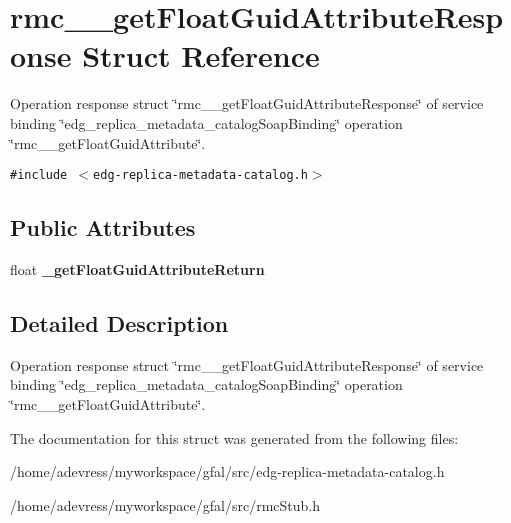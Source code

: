\section{rmc\_\-\_\-get\-Float\-Guid\-Attribute\-Response Struct Reference}
\label{structrmc____getFloatGuidAttributeResponse}
Operation response struct \char`\"{}rmc\_\-\_\-get\-Float\-Guid\-Attribute\-Response\char`\"{} of service binding \char`\"{}edg\_\-replica\_\-metadata\_\-catalog\-Soap\-Binding\char`\"{} operation \char`\"{}rmc\_\-\_\-get\-Float\-Guid\-Attribute\char`\"{}.  


{\tt \#include $<$edg-replica-metadata-catalog.h$>$}

\subsection*{Public Attributes}
\begin{CompactItemize}
\item 
float \textbf{\_\-get\-Float\-Guid\-Attribute\-Return}\label{structrmc____getFloatGuidAttributeResponse_baa99e47b8efab7ce43c2acffb96f98f}

\end{CompactItemize}


\subsection{Detailed Description}
Operation response struct \char`\"{}rmc\_\-\_\-get\-Float\-Guid\-Attribute\-Response\char`\"{} of service binding \char`\"{}edg\_\-replica\_\-metadata\_\-catalog\-Soap\-Binding\char`\"{} operation \char`\"{}rmc\_\-\_\-get\-Float\-Guid\-Attribute\char`\"{}. 



The documentation for this struct was generated from the following files:\begin{CompactItemize}
\item 
/home/adevress/myworkspace/gfal/src/edg-replica-metadata-catalog.h\item 
/home/adevress/myworkspace/gfal/src/rmc\-Stub.h\end{CompactItemize}
